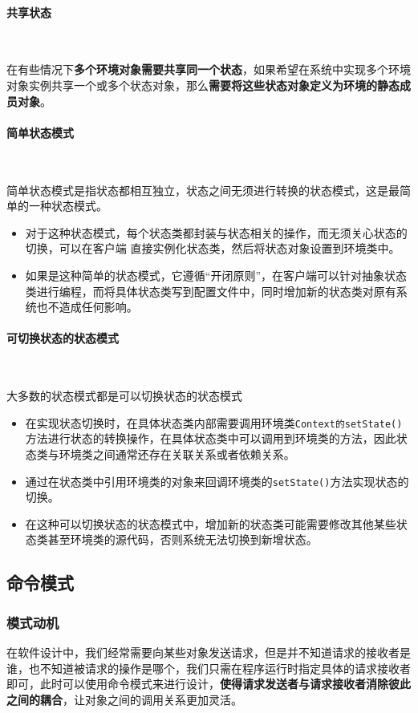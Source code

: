 \paragraph*{共享状态}~{} \par
在有些情况下\textbf{多个环境对象需要共享同一个状态}，如果希望在系统中实现多个环境对象实例共享一个或多个状态对象，那么\textbf{需要将这些状态对象定义为环境的静态成员对象}。

\paragraph*{简单状态模式}~{} \par
简单状态模式是指状态都相互独立，状态之间无须进行转换的状态模式，这是最简单的一种状态模式。
\begin{itemize}
    \item 对于这种状态模式，每个状态类都封装与状态相关的操作，而无须关心状态的切换，可以在客户端 直接实例化状态类，然后将状态对象设置到环境类中。
    \item 如果是这种简单的状态模式，它遵循“开闭原则”，在客户端可以针对抽象状态类进行编程，而将具体状态类写到配置文件中，同时增加新的状态类对原有系统也不造成任何影响。
\end{itemize} 

\paragraph*{可切换状态的状态模式}~{} \par
大多数的状态模式都是可以切换状态的状态模式
\begin{itemize}
    \item 在实现状态切换时，在具体状态类内部需要调用环境类\;\verb|Context的setState()|\;方法进行状态的转换操作，在具体状态类中可以调用到环境类的方法，因此状态类与环境类之间通常还存在关联关系或者依赖关系。
    \item 通过在状态类中引用环境类的对象来回调环境类的\;\verb|setState()|\;方法实现状态的切换。
    \item 在这种可以切换状态的状态模式中，增加新的状态类可能需要修改其他某些状态类甚至环境类的源代码，否则系统无法切换到新增状态。
\end{itemize}


\subsection{命令模式}

\subsubsection{模式动机}
在软件设计中，我们经常需要向某些对象发送请求，但是并不知道请求的接收者是谁，也不知道被请求的操作是哪个，我们只需在程序运行时指定具体的请求接收者即可，此时可以使用命令模式来进行设计，\textbf{使得请求发送者与请求接收者消除彼此之间的耦合}，让对象之间的调用关系更加灵活。

